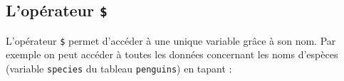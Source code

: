 \documentclass[
  letterpaper,
  DIV=11,
  numbers=noendperiod]{scrreprt}
\newenvironment{Shaded}{\begin{snugshade}}{\end{snugshade}}
\newcommand{\NormalTok}[1]{\textcolor[rgb]{0.00,0.23,0.31}{#1}}
\newcommand{\SpecialCharTok}[1]{\textcolor[rgb]{0.37,0.37,0.37}{#1}}
\begin{document}
\hypertarget{lopuxe9rateur}{%
\subsection{\texorpdfstring{L'opérateur
\texttt{\$}}{L'opérateur \$}}\label{lopuxe9rateur}}

L'opérateur \texttt{\$} permet d'accéder à une unique variable grâce à
son nom. Par exemple on peut accéder à toutes les données concernant les
noms d'espèces (variable \texttt{species} du tableau \texttt{penguins})
en tapant :

\begin{Shaded}
\end{Shaded}
\end{document}
